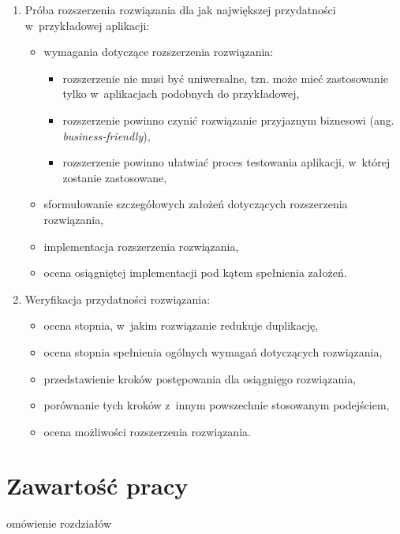 \begin{enumerate}
 \item Próba rozszerzenia rozwiązania dla jak największej przydatności w~przykładowej aplikacji:
  \begin{itemize}
   \item wymagania dotyczące rozszerzenia rozwiązania:
    \begin{itemize}
     \item rozszerzenie nie musi być uniwersalne, tzn. może mieć zastosowanie tylko w~aplikacjach podobnych do przykładowej,
     \item rozszerzenie powinno czynić rozwiązanie przyjaznym biznesowi (ang. \emph{business-friendly}),
     \item rozszerzenie powinno ułatwiać proces testowania aplikacji, w~której zostanie zastosowane,
    \end{itemize}
   \item sformułowanie szczegółowych założeń dotyczących rozszerzenia rozwiązania,
   \item implementacja rozszerzenia rozwiązania,
   \item ocena osiągniętej implementacji pod kątem spełnienia założeń.
  \end{itemize}
  
 \item Weryfikacja przydatności rozwiązania:
  \begin{itemize}
   \item ocena stopnia, w~jakim rozwiązanie redukuje duplikację,
   \item ocena stopnia spełnienia ogólnych wymagań dotyczących rozwiązania,
   \item przedstawienie kroków postępowania dla osiągnięgo rozwiązania,
   \item porównanie tych kroków z~innym powszechnie stosowanym podejściem,
   \item ocena możliwości rozszerzenia rozwiązania.
  \end{itemize}

\end{enumerate}



\section{Zawartość pracy}

omówienie rozdziałów
